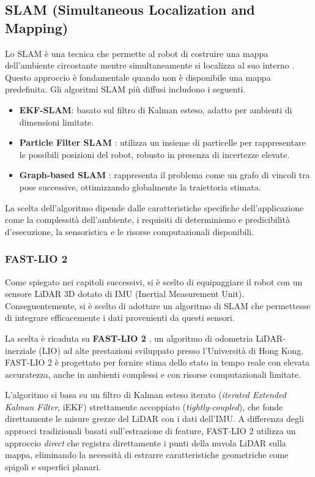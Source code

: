\subsection{SLAM (Simultaneous Localization and Mapping)}
Lo SLAM è una tecnica che permette al robot di costruire una mappa dell'ambiente circostante mentre simultaneamente si localizza al suo interno \cite{durrantwhyte2006slam}. Questo approccio è fondamentale quando non è disponibile una mappa predefinita. Gli algoritmi SLAM più diffusi includono i seguenti.
\begin{itemize}
    \item \textbf{EKF-SLAM}: basato sul filtro di Kalman esteso, adatto per ambienti di dimensioni limitate.
    \item \textbf{Particle Filter SLAM} \cite{thrun2002particleslam}: utilizza un insieme di particelle per rappresentare le possibili posizioni del robot, robusto in presenza di incertezze elevate.
    \item \textbf{Graph-based SLAM} \cite{grisetti2010graphslam}: rappresenta il problema come un grafo di vincoli tra pose successive, ottimizzando globalmente la traiettoria stimata.
\end{itemize}

La scelta dell'algoritmo dipende dalle caratteristiche specifiche dell'applicazione come la complessità dell'ambiente, i requisiti di determinismo e predicibilità d'esecuzione, la sensoristica e le risorse computazionali disponibili.

\subsubsection{FAST-LIO 2}
Come spiegato nei capitoli successivi, si è scelto di equipaggiare il robot con un sensore LiDAR 3D dotato di IMU (Inertial Measurement Unit).
Conseguentemente, si è scelto di adottare un algoritmo di SLAM che permettesse di integrare efficacemente i dati provenienti da questi sensori.

La scelta è ricaduta su \textbf{FAST-LIO 2} \cite{xu2022fastlio2}, un algoritmo di odometria LiDAR-inerziale (LIO) ad alte prestazioni sviluppato presso l'Università di Hong Kong. FAST-LIO 2 è progettato per fornire stima dello stato in tempo reale con elevata accuratezza, anche in ambienti complessi e con risorse computazionali limitate.

L'algoritmo si basa su un filtro di Kalman esteso iterato (\textit{iterated Extended Kalman Filter}, iEKF) strettamente accoppiato (\textit{tightly-coupled}), che fonde direttamente le misure grezze del LiDAR con i dati dell'IMU. A differenza degli approcci tradizionali basati sull'estrazione di feature, FAST-LIO 2 utilizza un approccio \textit{direct} che registra direttamente i punti della nuvola LiDAR sulla mappa, eliminando la necessità di estrarre caratteristiche geometriche come spigoli e superfici planari.

